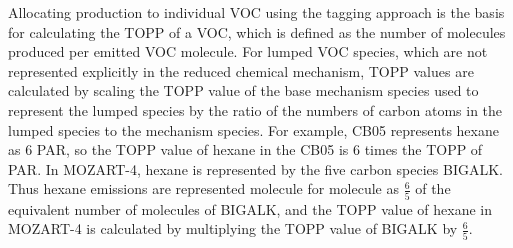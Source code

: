 Allocating  production to individual VOC using the tagging approach is the basis for calculating the TOPP of a VOC, which is defined as the number of  molecules produced per emitted VOC molecule.
For lumped VOC species, which are not represented explicitly in the reduced chemical mechanism, TOPP values are calculated by scaling the TOPP value of the base mechanism species used to represent the lumped species by the ratio of the numbers of carbon atoms in the lumped species to the mechanism species.
For example, CB05 represents hexane as $6$ PAR, so the TOPP value of hexane in the CB05 is $6$ times the TOPP of PAR.
In MOZART-4, hexane is represented by the five carbon species BIGALK.
Thus hexane emissions are represented molecule for molecule as $\frac{6}{5}$ of the equivalent number of molecules of BIGALK, and the TOPP value of hexane in MOZART-4 is calculated by multiplying the TOPP value of BIGALK by $\frac{6}{5}$.
